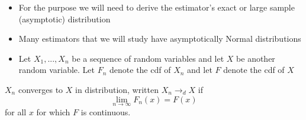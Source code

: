 \documentclass[notes=show]{beamer}
\begin{document}
\begin{frame}%


\begin{itemize}
\item For the purpose we will need to derive the estimator's exact or large
sample (asymptotic) distribution

\item Many estimators that we will study have asymptotically Normal
distributions

\item Let $X_{1},...,X_{n}$ be a sequence of random variables and let $X$ be
another random variable. Let $F_{n}$ denote the cdf of $X_{n}$ and let $F$
denote the cdf of $X$
\end{itemize}

\begin{definition}
$X_{n}$ converges to $X$ in distribution, written $X_{n}\rightarrow _{d}X$ if%
\begin{equation*}
\lim_{n\rightarrow \infty }F_{n}(x)=F(x)
\end{equation*}%
for all $x$ for which $F$ is continuous.
\end{definition}

\end{frame}%
\end{document}
